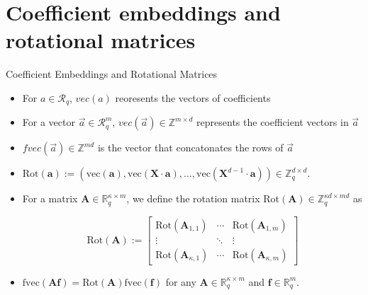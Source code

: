 \section{Coefficient embeddings and rotational matrices}
\begin{frame}
    {Coefficient Embeddings and Rotational Matrices}
    \begin{itemize}
        \item For $a \in \mathcal{R}_q$, $vec(a)$ reoresents the vectors of coefficients
        \item For a vector $\overrightarrow{a} \in \mathcal{R}^m_q$, $vec(\overrightarrow{a}) \in \mathbb{Z}^{m \times d}$ represents the coefficient vectors in $\overrightarrow{a}$
        \item $fvec(\overrightarrow{a}) \in \mathbb{Z}^{md}$ is the vector that concatonates the rows of $\overrightarrow{a}$
    \end{itemize}

    \begin{itemize}
        \item $\text{Rot}(\mathbf{a}) := (\text{vec}(\mathbf{a}), \text{vec}(\mathbf{X} \cdot \mathbf{a}), \ldots, \text{vec}(\mathbf{X}^{d-1} \cdot \mathbf{a})) \in \mathbb{Z}_q^{d \times d}$.
        \item
              For a matrix $\mathbf{A} \in \mathbb{R}_q^{\kappa \times m}$, we define the rotation matrix $\text{Rot}(\mathbf{A}) \in \mathbb{Z}_q^{\kappa d \times md}$ as

              \[
                  \text{Rot}(\mathbf{A}) :=
                  \begin{bmatrix}
                      \text{Rot}(\mathbf{A}_{1,1})      & \cdots & \text{Rot}(\mathbf{A}_{1,m})      \\
                      \vdots                            & \ddots & \vdots                            \\
                      \text{Rot}(\mathbf{A}_{\kappa,1}) & \cdots & \text{Rot}(\mathbf{A}_{\kappa,m})
                  \end{bmatrix}
              \]

        \item $\text{fvec}(\mathbf{A} \mathbf{f}) = \text{Rot}(\mathbf{A})\text{fvec}(\mathbf{f})$ for any $\mathbf{A} \in \mathbb{R}_q^{\kappa \times m}$ and $\mathbf{f} \in \mathbb{R}_q^m$.
    \end{itemize}

\end{frame}